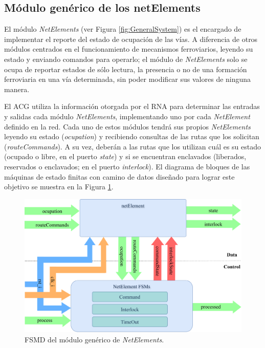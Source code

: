 \subsection{Módulo genérico de los netElements}
	\label{sec:ACG_net}
	
	El módulo \textit{NetElements} (ver Figura \ref{fig:GeneralSystem}) es el encargado de implementar el reporte del estado de ocupación de las vías. A diferencia de otros módulos centrados en el funcionamiento de mecanismos ferroviarios, leyendo su estado y enviando comandos para operarlo; el módulo de \textit{NetElements} solo se ocupa de reportar estados de sólo lectura, la presencia o no de una formación ferroviaria en una vía determinada, sin poder modificar sus valores de ninguna manera.
	
	El ACG utiliza la información otorgada por el RNA para determinar las entradas y salidas cada módulo \textit{NetElements}, implementando uno por cada \textit{NetElement} definido en la red. Cada uno de estos módulos tendrá sus propios \textit{NetElements} leyendo su estado (\textit{ocupation}) y recibiendo consultas de las rutas que los solicitan (\textit{routeCommands}). A su vez, deberán a las rutas que los utilizan cuál es su estado (ocupado o libre, en el puerto \textit{state}) y si se encuentran enclavados (liberados, reservados o enclavados; en el puerto \textit{interlock}). El diagrama de bloques de las máquinas de estado finitas con camino de datos diseñado para lograr este objetivo se muestra en la Figura \ref{fig:NET_module}.
	
	\begin{figure}[H]
		\centering
		\includegraphics[width=1\textwidth]{Figuras/NET_module}
		\centering\caption{FSMD del módulo genérico de \textit{NetElements}.}
		\label{fig:NET_module}
	\end{figure}
	
